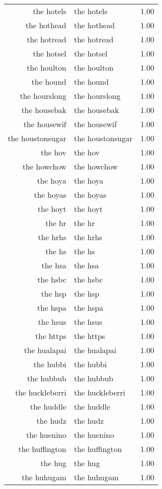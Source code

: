 \begin{table}[ht]
\begin{tabular}{rlr}
  the hotels & the hotels & 1.00 \\ 
  the hothead & the hothead & 1.00 \\ 
  the hotread & the hotread & 1.00 \\ 
  the hotsel & the hotsel & 1.00 \\ 
  the houlton & the houlton & 1.00 \\ 
  the hound & the hound & 1.00 \\ 
  the hourslong & the hourslong & 1.00 \\ 
  the housebak & the housebak & 1.00 \\ 
  the housewif & the housewif & 1.00 \\ 
  the houstonsugar & the houstonsugar & 1.00 \\ 
  the hov & the hov & 1.00 \\ 
  the howchow & the howchow & 1.00 \\ 
  the hoya & the hoya & 1.00 \\ 
  the hoyas & the hoyas & 1.00 \\ 
  the hoyt & the hoyt & 1.00 \\ 
  the hr & the hr & 1.00 \\ 
  the hrhs & the hrhs & 1.00 \\ 
  the hs & the hs & 1.00 \\ 
  the hsa & the hsa & 1.00 \\ 
  the hsbc & the hsbc & 1.00 \\ 
  the hsp & the hsp & 1.00 \\ 
  the hspa & the hspa & 1.00 \\ 
  the hsus & the hsus & 1.00 \\ 
  the https & the https & 1.00 \\ 
  the hualapai & the hualapai & 1.00 \\ 
  the hubbi & the hubbi & 1.00 \\ 
  the hubbub & the hubbub & 1.00 \\ 
  the huckleberri & the huckleberri & 1.00 \\ 
  the huddle & the huddle & 1.00 \\ 
  the hudz & the hudz & 1.00 \\ 
  the huenino & the huenino & 1.00 \\ 
  the huffington & the huffington & 1.00 \\ 
  the hug & the hug & 1.00 \\ 
  the huhugam & the huhugam & 1.00 \\ 

\end{tabular}
\end{table}
